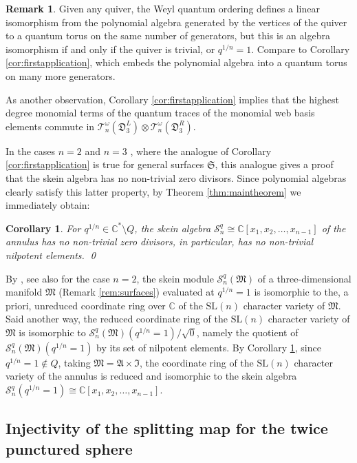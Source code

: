 \documentclass[12pt,
	]{amsart}
\newtheorem{corollary}[theorem]{Corollary}
\theoremstyle{definition}
\newtheorem{remark}[theorem]{Remark}
\newcommand{\mrm}[1]{\mathrm{#1}}
\newcommand{\mbb}[1]{\mathbb{#1}}
\newcommand{\mcal}[1]{\mathcal{#1}}
\newcommand{\mfrak}[1]{\mathfrak{#1}}
\newcommand{\C}{\mbb{C}}
\newcommand{\sC}{\C^\ast}
\newcommand{\nsl}{\mrm{SL}(n)}
\newcommand{\sk}{\mcal{S}_n^q}
\newcommand{\ann}{\mfrak{A}}
\newcommand{\man}{\mfrak{M}}
\newcommand{\surf}{\mfrak{S}}
\newcommand{\intt}{\mfrak{I}}
\newcommand{\badset}{Q}
\newcommand{\qroot}{q^{1/n}}
\newcommand{\ttriang}{\mfrak{D}_3}
\newcommand{\wroot}{\omega}
\newcommand{\qtorus}[1]{\mcal{T}_n^\wroot(#1)}
\begin{document}
\begin{remark}
Given any quiver, the Weyl quantum ordering defines a linear isomorphism from the polynomial algebra generated by the vertices of the quiver to a quantum torus on the same number of generators, but this is an algebra isomorphism if and only if the quiver is trivial, or $\qroot=1$.  Compare to Corollary \ref{cor:firstapplication}, which embeds the polynomial algebra into a quantum torus on many more generators.  

As another observation, Corollary \ref{cor:firstapplication} implies that the highest degree monomial terms of the quantum traces of the monomial web basis elements commute in $\qtorus{\ttriang^L}\otimes\qtorus{\ttriang^R}$.  
\end{remark}

In the cases $n=2$ and $n=3$ \cite{bonahonMR2851072, douglasMR4685684, kim2022rm}, where the analogue of Corollary \ref{cor:firstapplication} is true for general surfaces $\surf$, this analogue gives a proof that the skein algebra has no non-trivial zero divisors.  Since polynomial algebras clearly satisfy this latter property, by Theorem \ref{thm:maintheorem} we immediately obtain:

\begin{corollary}\label{cor:nonilpotents}
For $\qroot\in\sC\setminus\badset$, the skein algebra $\sk\cong\C[x_1,x_2,\dots,x_{n-1}]$ of the annulus has no non-trivial zero divisors, in particular, has no non-trivial nilpotent elements.  \qed
\end{corollary}

By \cite[Corollary 20]{SikoraAlgGeomTop05}, see also \cite{bullock1997rings, przytycki1997skein} for the case $n=2$, the skein module $\sk(\man)$ of a three-dimensional manifold $\man$ (Remark \ref{rem:surfaces}) evaluated at $\qroot=1$ is isomorphic to the, a priori, unreduced coordinate ring over $\C$ of the $\nsl$ character variety of $\man$.  Said another way, the reduced coordinate ring of the $\nsl$ character variety of $\man$ is isomorphic to $\sk(\man)(\qroot=1)/\sqrt{0}$, namely the quotient of $\sk(\man)(\qroot=1)$ by its set of nilpotent elements.  By Corollary \ref{cor:nonilpotents}, since $\qroot=1\notin\badset$, taking $\man=\ann\times\intt$, the coordinate ring of the $\nsl$ character variety of the annulus is reduced and isomorphic to the skein algebra $\sk(\qroot=1)\cong\C[x_1,x_2,\dots,x_{n-1}]$.   

\subsection{Injectivity of the splitting map for the twice punctured sphere}\label{ssec:injectivityofthesplittingmap}
\end{document}
